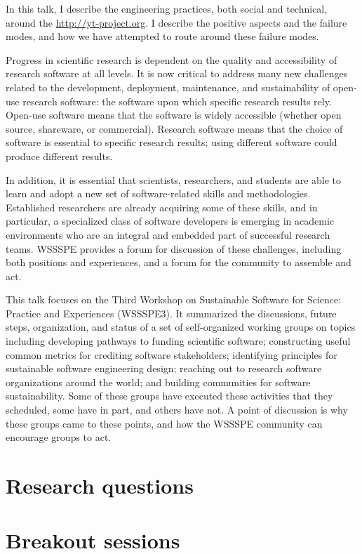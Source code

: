 \documentclass[a4paper,UKenglish]{dagrep}
\begin{document}
In this talk, I describe the engineering practices, both social and
technical, around the \href{yt project}{http://yt-project.org}.  I describe the
positive aspects and the failure modes, and how we have attempted to
route around these failure modes.


Progress in scientific research is dependent on the quality and accessibility of research software at all levels. It is now critical to address many new challenges related to the development, deployment, maintenance, and sustainability of open-use research software: the software upon which specific research results rely.  Open-use software means that the software is widely accessible (whether open source, shareware, or commercial).  Research software means that the choice of software is essential to specific research results; using different software could produce different results.

In addition, it is essential that scientists, researchers, and students are able to learn and adopt a new set of software-related skills and methodologies. Established researchers are already acquiring some of these skills, and in particular, a specialized class of software developers is emerging in academic environments who are an integral and embedded part of successful research teams. WSSSPE provides a forum for discussion of these challenges, including both positions and experiences, and a forum for the community to assemble and act.

This talk focuses on the Third Workshop on Sustainable Software for Science: Practice and Experiences (WSSSPE3). It summarized the discussions, future steps, organization, and status of a set of self-organized working groups on topics including developing pathways to funding scientific software; constructing useful common metrics for crediting software stakeholders; identifying principles for sustainable software engineering design; reaching out to research software organizations around the world; and building communities for software sustainability. Some of these groups have executed these activities that they scheduled, some have in part, and others have not.  A point of discussion is why these groups came to these points, and how the WSSSPE community can encourage groups to act. 



\section{Research questions}

\section{Breakout sessions}
\end{document}
